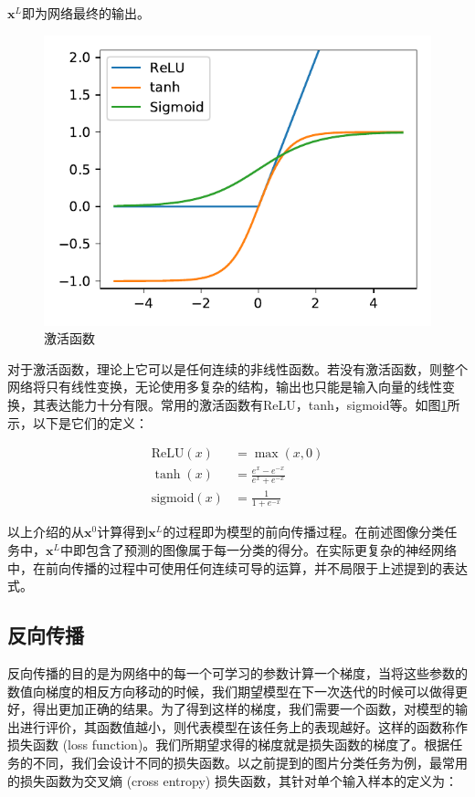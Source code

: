 $\bm{x}^L$即为网络最终的输出。

\begin{figure}[]
    \centering
    \includegraphics{figure/act.pdf}
    \caption{激活函数}
    \label{act-func}
\end{figure}

对于激活函数，理论上它可以是任何连续的非线性函数。若没有激活函数，则整个网络将只有线性变换，无论使用多复杂的结构，输出也只能是输入向量的线性变换，其表达能力十分有限。常用的激活函数有ReLU，tanh，sigmoid等。如图\ref{act-func}所示，以下是它们的定义：

\begin{align}
    \mathrm{ReLU}\left(x\right)&=\max{\left(x,0\right)}\\
    \tanh{\left(x\right)}&=\frac{e^x-e^{-x}}{e^x+e^{-x}}\\
    \mathrm{sigmoid}\left(x\right)&=\frac{1}{1+e^{-x}}
\end{align}

以上介绍的从$\bm{x}^0$计算得到$\bm{x}^L$的过程即为模型的前向传播过程。在前述图像分类任务中，$\bm{x}^L$中即包含了预测的图像属于每一分类的得分。在实际更复杂的神经网络中，在前向传播的过程中可使用任何连续可导的运算，并不局限于上述提到的表达式。

\subsection{反向传播}

反向传播的目的是为网络中的每一个可学习的参数计算一个梯度，当将这些参数的数值向梯度的相反方向移动的时候，我们期望模型在下一次迭代的时候可以做得更好，得出更加正确的结果。为了得到这样的梯度，我们需要一个函数，对模型的输出进行评价，其函数值越小，则代表模型在该任务上的表现越好。这样的函数称作损失函数 (loss function)。我们所期望求得的梯度就是损失函数的梯度了。根据任务的不同，我们会设计不同的损失函数。以之前提到的图片分类任务为例，最常用的损失函数为交叉熵 (cross entropy) 损失函数，其针对单个输入样本的定义为：

